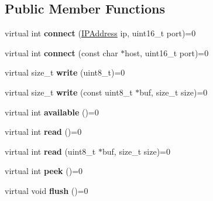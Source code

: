 \subsection*{Public Member Functions}
\begin{DoxyCompactItemize}
\item 
\hypertarget{class_client_a7b5d23b2df67ab5f84971100f1f9e825}{virtual int {\bfseries connect} (\hyperlink{class_i_p_address}{I\-P\-Address} ip, uint16\-\_\-t port)=0}\label{class_client_a7b5d23b2df67ab5f84971100f1f9e825}

\item 
\hypertarget{class_client_a475258d5bda463bac8ac60d391377e34}{virtual int {\bfseries connect} (const char $\ast$host, uint16\-\_\-t port)=0}\label{class_client_a475258d5bda463bac8ac60d391377e34}

\item 
\hypertarget{class_client_acde4db2f92186810af3493fd2c7535f0}{virtual size\-\_\-t {\bfseries write} (uint8\-\_\-t)=0}\label{class_client_acde4db2f92186810af3493fd2c7535f0}

\item 
\hypertarget{class_client_a7565f7448952b08e42489b3162638f69}{virtual size\-\_\-t {\bfseries write} (const uint8\-\_\-t $\ast$buf, size\-\_\-t size)=0}\label{class_client_a7565f7448952b08e42489b3162638f69}

\item 
\hypertarget{class_client_aebd60457902debb30b07971a16f24ebd}{virtual int {\bfseries available} ()=0}\label{class_client_aebd60457902debb30b07971a16f24ebd}

\item 
\hypertarget{class_client_a4afd50731ba321d1b9be909cb288a50b}{virtual int {\bfseries read} ()=0}\label{class_client_a4afd50731ba321d1b9be909cb288a50b}

\item 
\hypertarget{class_client_a699f8a687f8e4ab1c08cc4ea1da121bc}{virtual int {\bfseries read} (uint8\-\_\-t $\ast$buf, size\-\_\-t size)=0}\label{class_client_a699f8a687f8e4ab1c08cc4ea1da121bc}

\item 
\hypertarget{class_client_a9ae768d427519818aa552adf467bf65a}{virtual int {\bfseries peek} ()=0}\label{class_client_a9ae768d427519818aa552adf467bf65a}

\item 
\hypertarget{class_client_a50ab71f4bc571f6e246b20db4b3dd131}{virtual void {\bfseries flush} ()=0}\label{class_client_a50ab71f4bc571f6e246b20db4b3dd131}


\end{DoxyCompactItemize}

